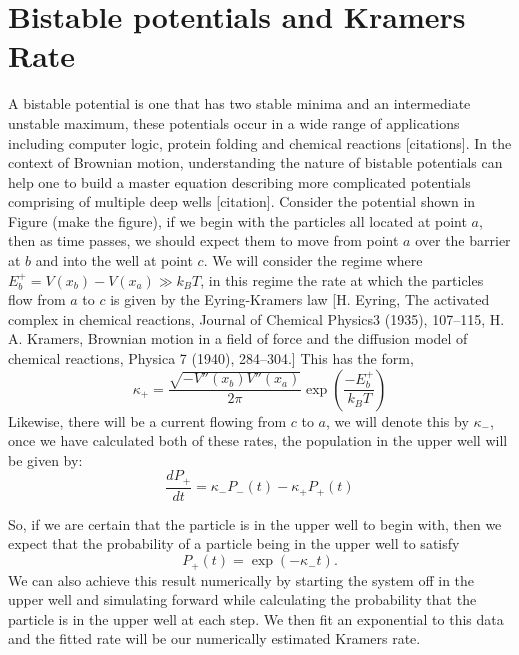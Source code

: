 \section{Bistable potentials and Kramers Rate}
A bistable potential is one that has two stable minima and an intermediate unstable maximum, these potentials occur in a wide range of applications including computer logic, protein folding and chemical reactions [citations]. In the context of Brownian motion, understanding the nature of bistable potentials can help one to build a master equation describing more complicated potentials comprising of multiple deep wells [citation]. Consider the potential shown in Figure (make the figure), if we begin with the particles all located at point $a$, then as time passes, we should expect them to move from point $a$ over the barrier at $b$ and into the well at point $c$. We will consider the regime where $E^+_b = V(x_b) - V(x_a) \gg k_B T$, in this regime the rate at which the particles flow from $a$ to $c$ is given by the Eyring-Kramers law [H. Eyring, The activated complex in chemical reactions, Journal of Chemical Physics3 (1935), 107–115, H. A. Kramers, Brownian motion in a field of force and the diffusion model of chemical reactions, Physica 7 (1940), 284–304.]
This has the form,
\begin{equation}
\kappa_+ = \frac{\sqrt{-V''(x_b) V''(x_a)}}{2 \pi} \exp \left({\frac{-E^+_b}{k_B T}} \right)
\end{equation}
Likewise, there will be a current flowing from $c$ to $a$, we will denote this by $\kappa_-$, once we have calculated both of these rates, the population in the upper well will be given by:
\begin{equation}
\frac{d P_+}{d t} = \kappa_- P_-(t) - \kappa_+ P_+(t)
\end{equation}

So, if we are certain that the particle is in the upper well to begin with, then we expect that the probability of a particle being in the upper well to satisfy
\begin{equation}
P_+(t) = \exp{(-\kappa_- t)}.
\end{equation}
We can also achieve this result numerically by starting the system off in the upper well and simulating forward while calculating the probability that the particle is in the upper well at each step. We then fit an exponential to this data and the fitted rate will be our numerically estimated Kramers rate. 










